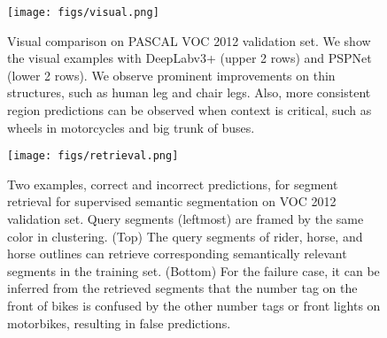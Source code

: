 \documentclass[10pt,twocolumn,letterpaper]{article}
\begin{document}
\begin{table*}[t]
  \centering
    \vspace{0.5pt}
    \caption{Per-class results on Cityscapes validation set. We conclude that network trained with SegSort outperforms Softmax consistently.}
    \label{tab:cityscapes}
\end{table*}


\begin{figure}
    \centering
    \texttt{[image: figs/visual.png]}
    \caption{Visual comparison on PASCAL VOC 2012 validation set. We show the visual examples with DeepLabv3+ (upper 2 rows) and PSPNet (lower 2 rows). We observe prominent improvements on thin structures, such as human leg and chair legs. Also, more consistent region predictions can be observed when context is critical, such as wheels in motorcycles and big trunk of buses.}
    \label{fig:visual}
\end{figure}



\begin{figure}
    \centering
    \texttt{[image: figs/retrieval.png]}
    \caption{Two examples, correct and incorrect predictions, for segment retrieval for supervised semantic segmentation on VOC 2012 validation set. Query segments (leftmost) are framed by the same color in clustering. (Top) The query segments of rider, horse, and horse outlines can retrieve corresponding semantically relevant segments in the training set. (Bottom) For the failure case, it can be inferred from the retrieved segments that the number tag on the front of bikes is confused by the other number tags or front lights on motorbikes, resulting in false predictions.}
    \label{fig:retrieval}
\end{figure}
\end{document}
